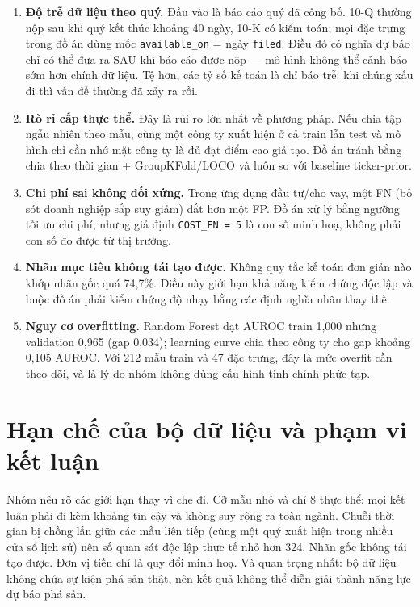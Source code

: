 \documentclass[13pt,a4paper]{extreport}
\begin{document}
\begin{enumerate}
\item \textbf{Độ trễ dữ liệu theo quý.} Đầu vào là báo cáo quý đã công bố. 10-Q thường nộp sau khi quý kết thúc khoảng 40 ngày, 10-K có kiểm toán; mọi đặc trưng trong đồ án dùng mốc \texttt{available\_on} = ngày \texttt{filed}. Điều đó có nghĩa dự báo chỉ có thể đưa ra SAU khi báo cáo được nộp — mô hình không thể cảnh báo sớm hơn chính dữ liệu. Tệ hơn, các tỷ số kế toán là chỉ báo trễ: khi chúng xấu đi thì vấn đề thường đã xảy ra rồi.
\item \textbf{Rò rỉ cấp thực thể.} Đây là rủi ro lớn nhất về phương pháp. Nếu chia tập ngẫu nhiên theo mẫu, cùng một công ty xuất hiện ở cả train lẫn test và mô hình chỉ cần nhớ mặt công ty là đủ đạt điểm cao giả tạo. Đồ án tránh bằng chia theo thời gian + GroupKFold/LOCO và luôn so với baseline ticker-prior.
\item \textbf{Chi phí sai không đối xứng.} Trong ứng dụng đầu tư/cho vay, một FN (bỏ sót doanh nghiệp sắp suy giảm) đắt hơn một FP. Đồ án xử lý bằng ngưỡng tối ưu chi phí, nhưng giả định \texttt{COST\_FN = 5} là con số minh hoạ, không phải con số đo được từ thị trường.
\item \textbf{Nhãn mục tiêu không tái tạo được.} Không quy tắc kế toán đơn giản nào khớp nhãn gốc quá 74,7\%. Điều này giới hạn khả năng kiểm chứng độc lập và buộc đồ án phải kiểm chứng độ nhạy bằng các định nghĩa nhãn thay thế.
\item \textbf{Nguy cơ overfitting.} Random Forest đạt AUROC train 1,000 nhưng validation 0,965 (gap 0,034); learning curve chia theo công ty cho gap khoảng 0,105 AUROC. Với 212 mẫu train và 47 đặc trưng, đây là mức overfit cần theo dõi, và là lý do nhóm không dùng cấu hình tinh chỉnh phức tạp.
\end{enumerate}

\section{Hạn chế của bộ dữ liệu và phạm vi kết luận}

Nhóm nêu rõ các giới hạn thay vì che đi. Cỡ mẫu nhỏ và chỉ 8 thực thể: mọi kết luận phải đi kèm khoảng tin cậy và không suy rộng ra toàn ngành. Chuỗi thời gian bị chồng lấn giữa các mẫu liên tiếp (cùng một quý xuất hiện trong nhiều cửa sổ lịch sử) nên số quan sát độc lập thực tế nhỏ hơn 324. Nhãn gốc không tái tạo được. Đơn vị tiền chỉ là quy đổi minh hoạ. Và quan trọng nhất: bộ dữ liệu không chứa sự kiện phá sản thật, nên kết quả không thể diễn giải thành năng lực dự báo phá sản.
\end{document}
